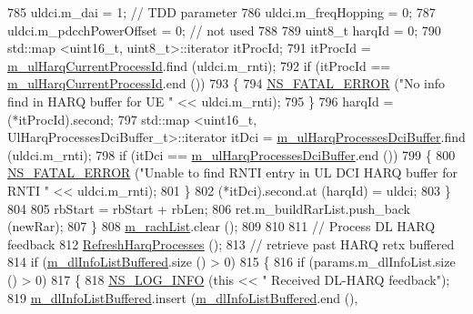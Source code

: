 \begin{DoxyCode}
785           uldci.m\_dai = 1; \textcolor{comment}{// TDD parameter}
786           uldci.m\_freqHopping = 0;
787           uldci.m\_pdcchPowerOffset = 0; \textcolor{comment}{// not used}
788 
789           uint8\_t harqId = 0;
790           std::map <uint16\_t, uint8\_t>::iterator itProcId;
791           itProcId = \hyperlink{classns3_1_1PfFfMacScheduler_aff9dac165a5c80c99f237adf365321d6}{m\_ulHarqCurrentProcessId}.find (uldci.m\_rnti);
792           \textcolor{keywordflow}{if} (itProcId == \hyperlink{classns3_1_1PfFfMacScheduler_aff9dac165a5c80c99f237adf365321d6}{m\_ulHarqCurrentProcessId}.end ())
793             \{
794               \hyperlink{group__fatal_ga5131d5e3f75d7d4cbfd706ac456fdc85}{NS\_FATAL\_ERROR} (\textcolor{stringliteral}{"No info find in HARQ buffer for UE "} << uldci.m\_rnti);
795             \}
796           harqId = (*itProcId).second;
797           std::map <uint16\_t, UlHarqProcessesDciBuffer\_t>::iterator itDci = 
      \hyperlink{classns3_1_1PfFfMacScheduler_a694ef4299832b3652468b0898601b2de}{m\_ulHarqProcessesDciBuffer}.find (uldci.m\_rnti);
798           \textcolor{keywordflow}{if} (itDci == \hyperlink{classns3_1_1PfFfMacScheduler_a694ef4299832b3652468b0898601b2de}{m\_ulHarqProcessesDciBuffer}.end ())
799             \{
800               \hyperlink{group__fatal_ga5131d5e3f75d7d4cbfd706ac456fdc85}{NS\_FATAL\_ERROR} (\textcolor{stringliteral}{"Unable to find RNTI entry in UL DCI HARQ buffer for RNTI "} << 
      uldci.m\_rnti);
801             \}
802           (*itDci).second.at (harqId) = uldci;
803         \}
804       
805       rbStart = rbStart + rbLen;
806       ret.m\_buildRarList.push\_back (newRar);
807     \}
808   \hyperlink{classns3_1_1PfFfMacScheduler_a850a31ab66c0a1d24207311ceee03ce7}{m\_rachList}.clear ();
809 
810 
811   \textcolor{comment}{// Process DL HARQ feedback}
812   \hyperlink{classns3_1_1PfFfMacScheduler_a00c00addd2a64aea7844298088f66e30}{RefreshHarqProcesses} ();
813   \textcolor{comment}{// retrieve past HARQ retx buffered}
814   \textcolor{keywordflow}{if} (\hyperlink{classns3_1_1PfFfMacScheduler_af3c266623addc28fc6ecd97901183a2f}{m\_dlInfoListBuffered}.size () > 0)
815     \{
816       \textcolor{keywordflow}{if} (params.m\_dlInfoList.size () > 0)
817         \{
818           \hyperlink{group__logging_gafbd73ee2cf9f26b319f49086d8e860fb}{NS\_LOG\_INFO} (\textcolor{keyword}{this} << \textcolor{stringliteral}{" Received DL-HARQ feedback"});
819           \hyperlink{classns3_1_1PfFfMacScheduler_af3c266623addc28fc6ecd97901183a2f}{m\_dlInfoListBuffered}.insert (\hyperlink{classns3_1_1PfFfMacScheduler_af3c266623addc28fc6ecd97901183a2f}{m\_dlInfoListBuffered}.end (),

\end{DoxyCode}
